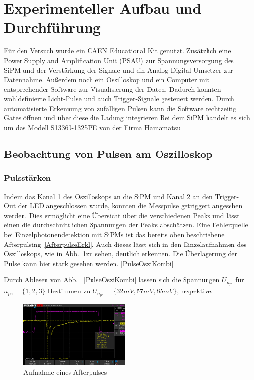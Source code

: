 \documentclass[12pt]{article}
\begin{document}
\section{Experimenteller Aufbau und Durchführung}
Für den Versuch wurde ein CAEN Educational Kit genutzt.
Zusätzlich eine Power Supply and Amplification Unit (PSAU) zur Spannungsversorgung des SiPM und der Verstärkung der Signale und ein Analog-Digital-Umsetzer zur Datennahme.
Außerdem noch ein Oszilloskop und ein Computer mit entsprechender Software zur Visualisierung der Daten.
Dadurch konnten wohldefinierte Licht-Pulse und auch Trigger-Signale gesteuert werden.
Durch automatisierte Erkennung von zufälligen Pulsen kann die Software rechtzeitig Gates öffnen und über diese die Ladung integrieren
Bei dem SiPM handelt es sich um das Modell S13360-1325PE von der Firma Hamamatsu~\cite{Hamamatsu}.


\subsection{Beobachtung von Pulsen am Oszilloskop}
\subsubsection{Pulsstärken}
Indem das Kanal 1 des Oszilloskops an die SiPM und Kanal 2 an den Trigger-Out der LED angeschlossen wurde, konnten die Messpulse getriggert angesehen werden.
Dies ermöglicht eine Übersicht über die verschiedenen Peaks und lässt einen die durchschnittlichen Spannungen der Peaks abschätzen.
Eine Fehlerquelle bei Einzelphotonendetektion mit SiPMs ist das bereits oben beschriebene Afterpulsing~\ref{AfterpulseErkl}.
Auch dieses lässt sich in den Einzelaufnahmen des Oszilloskops, wie in Abb.~\ref{AfterpulseGrafik}zu sehen, deutlich erkennen.
Die Überlagerung der Pulse kann hier stark gesehen werden.
\ref{PulseOsziKombi}

Durch Ablesen von Abb. ~\ref{PulseOsziKombi} lassen sich die Spannungen $U_{n_{pe}}$ für $n_{pe} = \{1, 2, 3\}$ Bestimmen zu $U_{n_{pe}} = \{32mV,  57mV, 85mV\}$, respektive. 

\begin{figure}[h!]
  \centering
  \includegraphics[width=0.49\textwidth]{Grafiken/4-1/Afterpuls}
  \caption{Aufnahme eines Afterpulses}
  \label{AfterpulseGrafik}
\end{figure}
\end{document}
